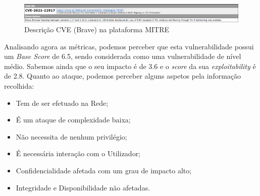 \documentclass[11t]{article}
\begin{document}
\vspace{0.2cm}

\begin{figure}[H]
    \centering
    \includegraphics[width=\textwidth]{images/descricaoBrave.png}
    \caption{Descrição CVE (Brave) na plataforma MITRE}
\end{figure}

\vspace{0.4cm}

Analisando agora as métricas, podemos perceber que esta vulnerabilidade possui um \textit{Base Score} de 6.5, sendo considerada como uma vulnerabilidade de nível médio. Sabemos ainda que o seu impacto é de 3.6 e o \textit{score} da sua \textit{exploitability} é de 2.8. Quanto ao ataque, podemos perceber alguns aspetos pela informação recolhida:
\begin{itemize}
    \item Tem de ser efetuado na Rede;
    \item É um ataque de complexidade baixa;
    \item Não necessita de nenhum privilégio;
    \item É necessária interação com o Utilizador;
    \item Confidencialidade afetada com um grau de impacto alto;
    \item Integridade e Disponibilidade não afetadas.
\end{itemize}

\vspace{0.1cm}
\end{document}
